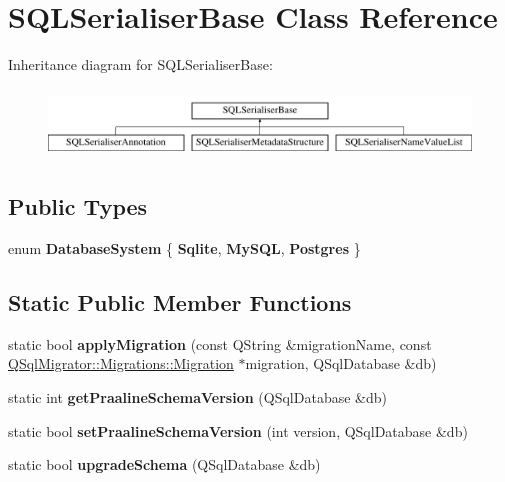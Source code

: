 \hypertarget{class_s_q_l_serialiser_base}{}\section{S\+Q\+L\+Serialiser\+Base Class Reference}
\label{class_s_q_l_serialiser_base}
Inheritance diagram for S\+Q\+L\+Serialiser\+Base\+:\begin{figure}[H]
\begin{center}
\leavevmode
\includegraphics[height=1.839080cm]{class_s_q_l_serialiser_base}
\end{center}
\end{figure}
\subsection*{Public Types}
\begin{DoxyCompactItemize}
\item 
\mbox{\label{class_s_q_l_serialiser_base_ad4ddb3b9334ffd7cb8c2fa9f76f0d09e}} 
enum {\bfseries Database\+System} \{ {\bfseries Sqlite}, 
{\bfseries My\+S\+QL}, 
{\bfseries Postgres}
 \}
\end{DoxyCompactItemize}
\subsection*{Static Public Member Functions}
\begin{DoxyCompactItemize}
\item 
\mbox{\label{class_s_q_l_serialiser_base_a99d4d4ad4ff76c0816018514292f4c69}} 
static bool {\bfseries apply\+Migration} (const Q\+String \&migration\+Name, const \hyperlink{class_q_sql_migrator_1_1_migrations_1_1_migration}{Q\+Sql\+Migrator\+::\+Migrations\+::\+Migration} $\ast$migration, Q\+Sql\+Database \&db)
\item 
\mbox{\label{class_s_q_l_serialiser_base_af8c4d09460e55732b8b1e40f2760be14}} 
static int {\bfseries get\+Praaline\+Schema\+Version} (Q\+Sql\+Database \&db)
\item 
\mbox{\label{class_s_q_l_serialiser_base_a7fb5700abf78e0347f853ec7237e6bd4}} 
static bool {\bfseries set\+Praaline\+Schema\+Version} (int version, Q\+Sql\+Database \&db)
\item 
\mbox{\label{class_s_q_l_serialiser_base_aff20acb1af8173f415a6774e58e2dd1a}} 
static bool {\bfseries upgrade\+Schema} (Q\+Sql\+Database \&db)
\end{DoxyCompactItemize}


